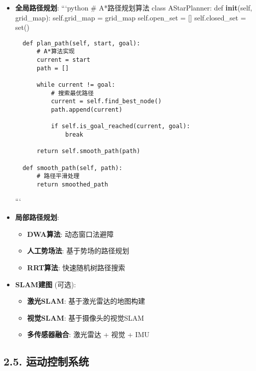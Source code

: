 \begin{itemize}
\item
  \textbf{全局路径规划}: ```python \# A*路径规划算法 class AStarPlanner:
  def \textbf{init}(self, grid\_map): self.grid\_map = grid\_map
  self.open\_set = {[}{]} self.closed\_set = set()

\begin{lstlisting}
  def plan_path(self, start, goal):
      # A*算法实现
      current = start
      path = []

      while current != goal:
          # 搜索最优路径
          current = self.find_best_node()
          path.append(current)

          if self.is_goal_reached(current, goal):
              break

      return self.smooth_path(path)

  def smooth_path(self, path):
      # 路径平滑处理
      return smoothed_path
\end{lstlisting}

  ```
\item
  \textbf{局部路径规划}:

  \begin{itemize}
  \tightlist
  \item
    \textbf{DWA算法}: 动态窗口法避障
  \item
    \textbf{人工势场法}: 基于势场的路径规划
  \item
    \textbf{RRT算法}: 快速随机树路径搜索
  \end{itemize}
\item
  \textbf{SLAM建图} (可选):

  \begin{itemize}
  \tightlist
  \item
    \textbf{激光SLAM}: 基于激光雷达的地图构建
  \item
    \textbf{视觉SLAM}: 基于摄像头的视觉SLAM
  \item
    \textbf{多传感器融合}: 激光雷达 + 视觉 + IMU
  \end{itemize}
\end{itemize}

\subsection{2.5.
运动控制系统}\label{ux8fd0ux52a8ux63a7ux5236ux7cfbux7edf}

